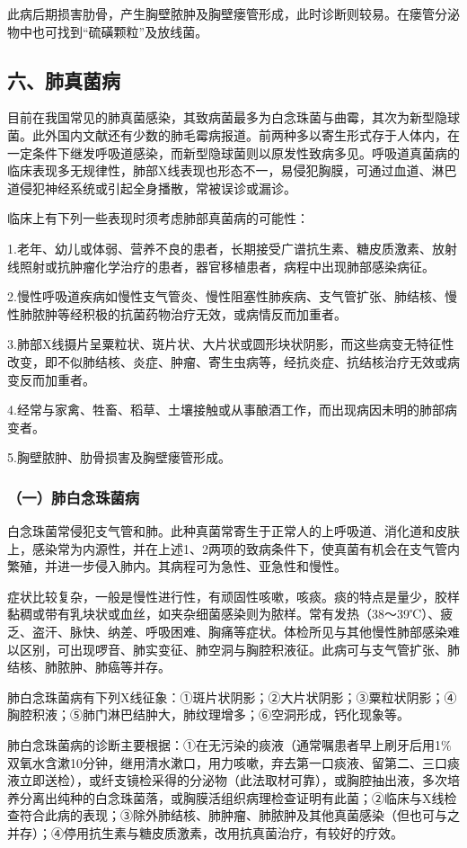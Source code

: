 此病后期损害肋骨，产生胸壁脓肿及胸壁瘘管形成，此时诊断则较易。在瘘管分泌物中也可找到“硫磺颗粒”及放线菌。

\subsection{六、肺真菌病}

目前在我国常见的肺真菌感染，其致病菌最多为白念珠菌与曲霉，其次为新型隐球菌。此外国内文献还有少数的肺毛霉病报道。前两种多以寄生形式存于人体内，在一定条件下继发呼吸道感染，而新型隐球菌则以原发性致病多见。呼吸道真菌病的临床表现多无规律性，肺部X线表现也形态不一，易侵犯胸膜，可通过血道、淋巴道侵犯神经系统或引起全身播散，常被误诊或漏诊。

临床上有下列一些表现时须考虑肺部真菌病的可能性：

1.老年、幼儿或体弱、营养不良的患者，长期接受广谱抗生素、糖皮质激素、放射线照射或抗肿瘤化学治疗的患者，器官移植患者，病程中出现肺部感染病征。

2.慢性呼吸道疾病如慢性支气管炎、慢性阻塞性肺疾病、支气管扩张、肺结核、慢性肺脓肿等经积极的抗菌药物治疗无效，或病情反而加重者。

3.肺部X线摄片呈粟粒状、斑片状、大片状或圆形块状阴影，而这些病变无特征性改变，即不似肺结核、炎症、肿瘤、寄生虫病等，经抗炎症、抗结核治疗无效或病变反而加重者。

4.经常与家禽、牲畜、稻草、土壤接触或从事酿酒工作，而出现病因未明的肺部病变者。

5.胸壁脓肿、肋骨损害及胸壁瘘管形成。

\subsubsection{（一）肺白念珠菌病}

白念珠菌常侵犯支气管和肺。此种真菌常寄生于正常人的上呼吸道、消化道和皮肤上，感染常为内源性，并在上述1、2两项的致病条件下，使真菌有机会在支气管内繁殖，并进一步侵入肺内。其病程可为急性、亚急性和慢性。

症状比较复杂，一般是慢性进行性，有顽固性咳嗽，咳痰。痰的特点是量少，胶样黏稠或带有乳块状或血丝，如夹杂细菌感染则为脓样。常有发热（38～39℃）、疲乏、盗汗、脉快、纳差、呼吸困难、胸痛等症状。体检所见与其他慢性肺部感染难以区别，可出现啰音、肺实变征、肺空洞与胸腔积液征。此病可与支气管扩张、肺结核、肺脓肿、肺癌等并存。

肺白念珠菌病有下列X线征象：①斑片状阴影；②大片状阴影；③粟粒状阴影；④胸腔积液；⑤肺门淋巴结肿大，肺纹理增多；⑥空洞形成，钙化现象等。

肺白念珠菌病的诊断主要根据：①在无污染的痰液（通常嘱患者早上刷牙后用1\%双氧水含漱10分钟，继用清水漱口，用力咳嗽，弃去第一口痰液、留第二、三口痰液立即送检），或纤支镜检采得的分泌物（此法取材可靠），或胸腔抽出液，多次培养分离出纯种的白念珠菌落，或胸膜活组织病理检查证明有此菌；②临床与X线检查符合此病的表现；③除外肺结核、肺肿瘤、肺脓肿及其他真菌感染（但也可与之并存）；④停用抗生素与糖皮质激素，改用抗真菌治疗，有较好的疗效。


